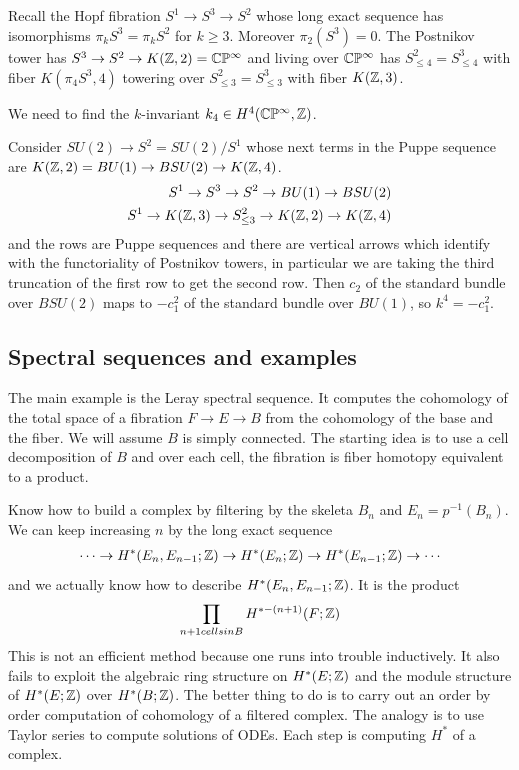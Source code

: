 \documentclass[12pt]{article}
\begin{document}
\subsection{}
Recall the Hopf fibration $S^1 \to S^3 \to S^2$ whose long exact sequence has isomorphisms $\pi_k S^3 = \pi_k S^2$ for $k\geq 3$. Moreover $\pi_2(S^3) = 0$. The Postnikov tower has $S^3 \to S^2 \to K(\mathbb{Z},2) = \mathbb{C}\mathbb{P}^\infty$ and living over $\mathbb{C}\mathbb{P}^\infty$ has $S^2_{\leq 4} = S^3_{\leq 4}$ with fiber $K(\pi_4 S^3,4)$
towering over $S^2_{\leq 3} = S^3_{\leq 3}$ with fiber $K(\mathbb{Z},3)$.

We need to find the $k$-invariant $k_4 \in H^4(\mathbb{C}\mathbb{P}^\infty,\mathbb{Z})$.

Consider $SU(2) \to S^2 = SU(2)/S^1$ whose next terms in the Puppe sequence are $K(\mathbb{Z},2) = BU(1) \to BSU(2) \to K(\mathbb{Z},4)$. 
\begin{align*}
    S^1 \to S^3 \to S^2 \to BU(1) \to BSU(2) \\
    S^1 \to K(\mathbb{Z},3) \to S^2_{\leq 3} \to K(\mathbb{Z},2) \to K(\mathbb{Z},4)
\end{align*} and the rows are Puppe sequences and there are vertical arrows which identify with the functoriality of Postnikov towers, in particular we are taking the third truncation of the first row to get the second row. Then $c_2$ of the standard bundle over $BSU(2)$ maps to $-c_1^2$ of the standard bundle over $BU(1)$, so $k^4 = -c_1^2$.

\subsection{Spectral sequences and examples}
The main example is the Leray spectral sequence. It computes the cohomology of the total space of a fibration $F \to E \to B$ from the cohomology of the base and the fiber. We will assume $B$ is simply connected. The starting idea is to use a cell decomposition of $B$ and over each cell, the fibration is fiber homotopy equivalent to a product.

Know how to build a complex by filtering by the skeleta $B_n$ and $E_n = p^{-1}(B_n)$. We can keep increasing $n$ by the long exact sequence \begin{align*}
    \cdots \to H^*(E_n,E_{n-1};\mathbb{Z}) \to H^*(E_n;\mathbb{Z}) \to H^*(E_{n-1};\mathbb{Z}) \to \cdots
\end{align*} and we actually know how to describe $H^*(E_n,E_{n-1};\mathbb{Z})$. It is the product \begin{align*}
    \prod_{n+1 cells in B} H^{* - (n+1)}(F;\mathbb{Z})
\end{align*}
This is not an efficient method because one runs into trouble inductively. It also fails to exploit the algebraic ring structure on $H^*(E;\mathbb{Z})$ and the module structure of $H^*(E;\mathbb{Z})$ over $H^*(B;\mathbb{Z})$. The better thing to do is to carry out an order by order computation of cohomology of a filtered complex. The analogy is to use Taylor series to compute solutions of ODEs. Each step is computing $H^*$ of a complex.
\end{document}
